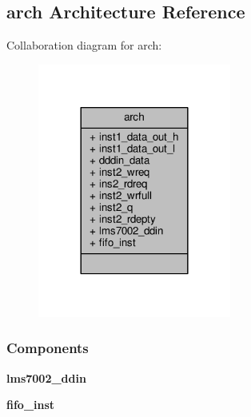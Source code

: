 \subsection{arch Architecture Reference}
\label{classdiq2__sampling_1_1arch}


Collaboration diagram for arch\+:\nopagebreak
\begin{figure}[H]
\begin{center}
\leavevmode
\includegraphics[width=180pt]{d9/d9c/classdiq2__sampling_1_1arch__coll__graph}
\end{center}
\end{figure}
\subsubsection*{Components}
 \begin{DoxyCompactItemize}
\item 
{\bf lms7002\+\_\+ddin}  {\bfseries }  
\item 
{\bf fifo\+\_\+inst}  {\bfseries }  
\end{DoxyCompactItemize}
